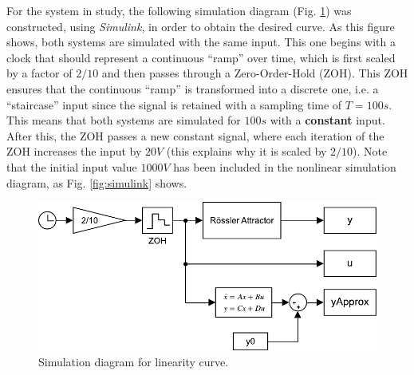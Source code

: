 For the system in study, the following simulation diagram (Fig. \ref{fig:linearitySimulink}) was constructed, using \textit{Simulink}, in order to obtain the desired curve. As this figure shows, both systems are simulated with the same input. This one begins with a clock that should represent a continuous ``ramp'' over time, which is first scaled by a factor of $2/10$ and then passes through a Zero-Order-Hold (ZOH). This ZOH ensures that the continuous ``ramp'' is transformed into a discrete one, i.e. a ``staircase'' input since the signal is retained with a sampling time of $T=100s$. This means that both systems are simulated for $100s$ with a \textbf{constant} input. After this, the ZOH passes a new constant signal, where each iteration of the ZOH increases the input by $20V$ (this explains why it is scaled by $2/10$). Note that the initial input value $1000V$ has been included in the nonlinear simulation diagram, as Fig. \ref{fig:simulink} shows.
\begin{figure}[H]
    \centering
    \includegraphics[scale=0.55]{figs/linearCurveSimulink.pdf}
    \caption{Simulation diagram for linearity curve.}
    \label{fig:linearitySimulink}
\end{figure}

